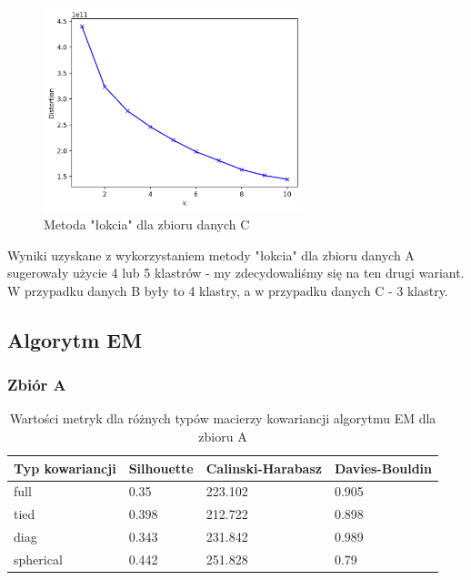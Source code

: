 \documentclass[a4paper,11pt]{article}
\begin{document}
\begin{figure}[H]
    	\centering
    	\includegraphics[width=0.67\textwidth]{images2/elbow_CC.png}
    	\caption{Metoda "łokcia" dla zbioru danych C}
    	\label{fig:e3}
\end{figure}

Wyniki uzyskane z wykorzystaniem metody "łokcia" dla zbioru danych A sugerowały użycie 4 lub 5 klastrów - my zdecydowaliśmy się na ten drugi wariant. W przypadku danych B były to 4 klastry, a w przypadku danych C - 3 klastry.

\subsection{Algorytm EM}

\subsubsection*{Zbiór A}

\begin{table}[H]
    \centering
    \begin{tabular}{|l|l|l|l|}
    \hline
    \textbf{Typ kowariancji} & \textbf{Silhouette} & \textbf{Calinski-Harabasz} & \textbf{Davies-Bouldin} \\ \hline
    full                     & 0.35                & 223.102                    & 0.905                   \\ \hline
    tied                     & 0.398               & 212.722                    & 0.898                   \\ \hline
    diag                     & 0.343               & 231.842                    & 0.989                   \\ \hline
    spherical                & 0.442               & 251.828                    & 0.79                    \\ \hline
    \end{tabular}
    \caption{Wartości metryk dla różnych typów macierzy kowariancji algorytmu EM dla zbioru A}
    \label{tab:em_a_cov}
\end{table}
\end{document}
